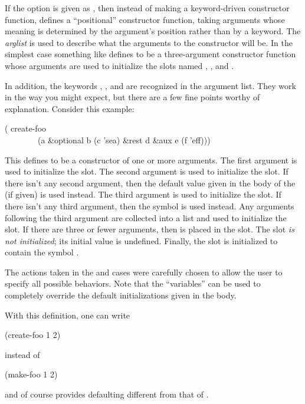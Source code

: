 If the  option is given as
,
then instead of making a keyword-driven constructor function,
 defines a ``positional'' constructor function,
taking arguments whose meaning is determined by the argument's position
rather than by a keyword.
The {\it arglist} is used to describe what the arguments to the
constructor will be.  In the simplest case something like
 defines  to be
a three-argument constructor function whose arguments are used to initialize the
slots named , , and .

In addition, the keywords , , and  are
recognized in the argument list.  They work in the way you might expect,
but there are a few fine points worthy of explanation.
Consider this example:
\begin{lisp}
( create-foo \\
~~~~~~~~(a \&optional b (c 'sea) \&rest d \&aux e (f 'eff)))
\end{lisp}
This defines  to be a constructor of one or more arguments.
The first argument is used to initialize the  slot.  The second
argument is used to initialize the  slot.  If there isn't any
second argument, then the default value given in the body of the
 (if given) is used instead.  The third argument is used to
initialize the  slot.  If there isn't any third argument, then the
symbol  is used instead.  Any arguments following the third
argument are collected into a list and used to initialize the 
slot.  If there are three or fewer arguments, then {\false} is placed in
the  slot.  The  slot {\it is not initialized}; its initial
value is undefined.  Finally, the  slot is initialized to contain
the symbol .

The actions taken in the  and  cases were carefully
chosen to allow the user to specify all possible behaviors.  Note that
the  ``variables'' can be used to completely override the default
initializations given in the body.

With this definition, one can write
\begin{lisp}
(create-foo 1 2)
\end{lisp}
instead of
\begin{lisp}
(make-foo  1  2)
\end{lisp}
and of course  provides defaulting different
from that of .


